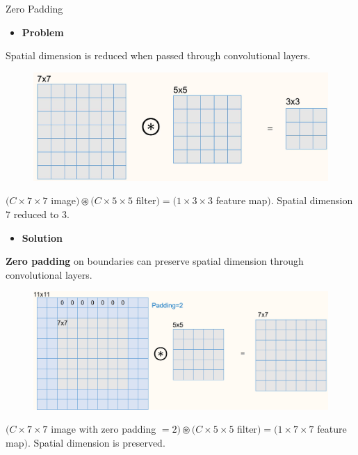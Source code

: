 \begin{frame}[allowframebreaks]

\begin{myconceptblock}{5.5}{Zero Padding}
    \begin{itemize}
        \item \textbf{Problem}
    \end{itemize}

    Spatial dimension is reduced when passed through convolutional layers.

    \begin{figure}[H]
        \centering
        \includegraphics[width=1.0\textwidth]{.././assets/5.3.jpg}
    \end{figure}

    $(C \times 7 \times 7$ image$) \circledast(C \times 5 \times 5$ filter$)=(1 \times 3 \times 3$ feature map$)$.
    Spatial dimension 7 reduced to 3.

    \par\noindent\textcolor{gray}{\hdashrule{\textwidth}{0.4pt}{1pt 2pt}}

    \begin{itemize}
        \item \textbf{Solution}
    \end{itemize}

    \textbf{Zero padding} on boundaries can preserve spatial dimension through convolutional layers.

    \begin{figure}[H]
        \centering
        \includegraphics[width=1.0\textwidth]{.././assets/5.4.png}
    \end{figure}

    $(C \times 7 \times 7$ image with zero padding $=2) \circledast(C \times 5 \times 5$ filter$)=(1 \times 7 \times 7$ feature map$)$.
    Spatial dimension is preserved.
\end{myconceptblock}

\end{frame}

